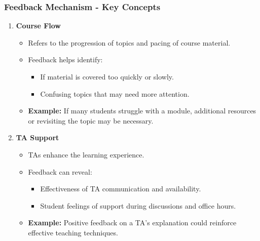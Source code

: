 \documentclass[aspectratio=169]{beamer}
\begin{document}
\begin{frame}[fragile]
    \frametitle{Feedback Mechanism - Key Concepts}
    \begin{enumerate}
        \item \textbf{Course Flow}
        \begin{itemize}
            \item Refers to the progression of topics and pacing of course material.
            \item Feedback helps identify:
            \begin{itemize}
                \item If material is covered too quickly or slowly.
                \item Confusing topics that may need more attention.
            \end{itemize}
            \item \textbf{Example:} If many students struggle with a module, additional resources or revisiting the topic may be necessary.
        \end{itemize}

        \item \textbf{TA Support}
        \begin{itemize}
            \item TAs enhance the learning experience.
            \item Feedback can reveal:
            \begin{itemize}
                \item Effectiveness of TA communication and availability.
                \item Student feelings of support during discussions and office hours.
            \end{itemize}
            \item \textbf{Example:} Positive feedback on a TA's explanation could reinforce effective teaching techniques.
        \end{itemize}
    \end{enumerate}
\end{frame}
\end{document}
